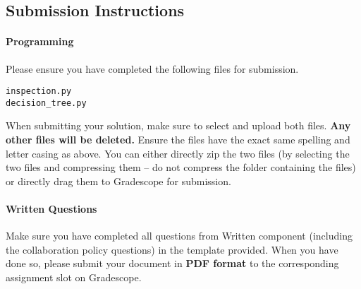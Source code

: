 \begin{comment}
    \begin{itemize}
    \item \texttt{Attribute:buying('expensive'or'cheap')}
    \item \texttt{Attribute:maint('high'or'low')}
    \item \texttt{Attribute:doors('Two'or'MoreThanTwo')}
    \item \texttt{Attribute:length('morethan3min'or'lessthan3min')}
    \item \texttt{Attribute:person('Two'or'MoreThanTwo')}
    \item \texttt{Attribute:boot('large'or'small')}
    \item \texttt{Attribute:safety('high'or'low')}
    \item \texttt{Class Label:class('yes'or'no')}
    \end{itemize}
    
    Please ensure your solution can handle data with these values.
 
\end{comment}
    
\subsection{Submission Instructions}

\paragraph{Programming}
Please ensure you have completed the following files for submission.


\begin{verbatim}
inspection.py
decision_tree.py
\end{verbatim}

When submitting your solution, make sure to select and upload both files. \textbf{Any other files will be deleted.} Ensure the files have the exact same spelling and letter casing as above. You can either directly zip the two files (by selecting the two files and compressing them -- do not compress the folder containing the files) or directly drag them to Gradescope for submission.


\paragraph{Written Questions}
Make sure you have completed all questions from Written component (including the collaboration policy questions) in the template provided.  When you have done so, please submit your document in \textbf{PDF format} to the corresponding assignment slot on Gradescope.



